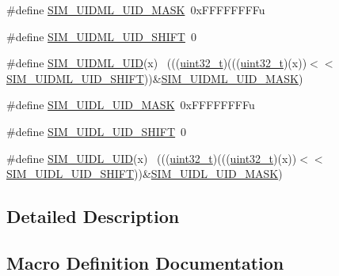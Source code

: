 \begin{DoxyCompactItemize}
\item 
\#define \hyperlink{group___s_i_m___register___masks_ga87fba538d2482490ddfdb1ef8a44ec66}{S\+I\+M\+\_\+\+U\+I\+D\+M\+L\+\_\+\+U\+I\+D\+\_\+\+M\+A\+SK}~0x\+F\+F\+F\+F\+F\+F\+F\+Fu
\item 
\#define \hyperlink{group___s_i_m___register___masks_gacedaca5a049852ee395767e70f806c14}{S\+I\+M\+\_\+\+U\+I\+D\+M\+L\+\_\+\+U\+I\+D\+\_\+\+S\+H\+I\+FT}~0
\item 
\#define \hyperlink{group___s_i_m___register___masks_ga875e571a37940db5491a13808878ccf0}{S\+I\+M\+\_\+\+U\+I\+D\+M\+L\+\_\+\+U\+ID}(x)                                              ~(((\hyperlink{_p_e___types_8h_a33594304e786b158f3fb30289278f5af}{uint32\+\_\+t})(((\hyperlink{_p_e___types_8h_a33594304e786b158f3fb30289278f5af}{uint32\+\_\+t})(x))$<$$<$\hyperlink{group___s_i_m___register___masks_gacedaca5a049852ee395767e70f806c14}{S\+I\+M\+\_\+\+U\+I\+D\+M\+L\+\_\+\+U\+I\+D\+\_\+\+S\+H\+I\+FT}))\&\hyperlink{group___s_i_m___register___masks_ga87fba538d2482490ddfdb1ef8a44ec66}{S\+I\+M\+\_\+\+U\+I\+D\+M\+L\+\_\+\+U\+I\+D\+\_\+\+M\+A\+SK})
\item 
\#define \hyperlink{group___s_i_m___register___masks_ga412340eabbcd0f0d48ce4886e9beb071}{S\+I\+M\+\_\+\+U\+I\+D\+L\+\_\+\+U\+I\+D\+\_\+\+M\+A\+SK}~0x\+F\+F\+F\+F\+F\+F\+F\+Fu
\item 
\#define \hyperlink{group___s_i_m___register___masks_ga6fb1383717ebfa6f47b5a5952fd21d63}{S\+I\+M\+\_\+\+U\+I\+D\+L\+\_\+\+U\+I\+D\+\_\+\+S\+H\+I\+FT}~0
\item 
\#define \hyperlink{group___s_i_m___register___masks_gadf1a47bfdde94787a3e6e785332aef8e}{S\+I\+M\+\_\+\+U\+I\+D\+L\+\_\+\+U\+ID}(x)                                                ~(((\hyperlink{_p_e___types_8h_a33594304e786b158f3fb30289278f5af}{uint32\+\_\+t})(((\hyperlink{_p_e___types_8h_a33594304e786b158f3fb30289278f5af}{uint32\+\_\+t})(x))$<$$<$\hyperlink{group___s_i_m___register___masks_ga6fb1383717ebfa6f47b5a5952fd21d63}{S\+I\+M\+\_\+\+U\+I\+D\+L\+\_\+\+U\+I\+D\+\_\+\+S\+H\+I\+FT}))\&\hyperlink{group___s_i_m___register___masks_ga412340eabbcd0f0d48ce4886e9beb071}{S\+I\+M\+\_\+\+U\+I\+D\+L\+\_\+\+U\+I\+D\+\_\+\+M\+A\+SK})
\end{DoxyCompactItemize}


\subsection{Detailed Description}


\subsection{Macro Definition Documentation}
